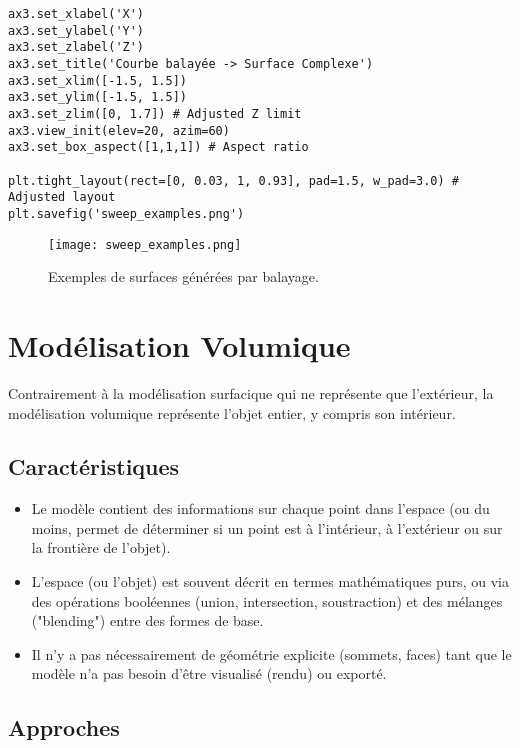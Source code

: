 \documentclass{article}
\begin{document}
\begin{verbatim}
ax3.set_xlabel('X')
ax3.set_ylabel('Y')
ax3.set_zlabel('Z')
ax3.set_title('Courbe balayée -> Surface Complexe')
ax3.set_xlim([-1.5, 1.5])
ax3.set_ylim([-1.5, 1.5])
ax3.set_zlim([0, 1.7]) # Adjusted Z limit
ax3.view_init(elev=20, azim=60)
ax3.set_box_aspect([1,1,1]) # Aspect ratio

plt.tight_layout(rect=[0, 0.03, 1, 0.93], pad=1.5, w_pad=3.0) # Adjusted layout
plt.savefig('sweep_examples.png')
\end{verbatim}

\begin{figure}[H]
\centering
\texttt{[image: sweep\_examples.png]}
\caption{Exemples de surfaces générées par balayage.}
\label{fig:sweep_examples}
\end{figure}

\section{Modélisation Volumique}

Contrairement à la modélisation surfacique qui ne représente que l'extérieur, la modélisation volumique représente l'objet entier, y compris son intérieur.

\subsection{Caractéristiques}
\begin{itemize}
    \item Le modèle contient des informations sur chaque point dans l'espace (ou du moins, permet de déterminer si un point est à l'intérieur, à l'extérieur ou sur la frontière de l'objet).
    \item L'espace (ou l'objet) est souvent décrit en termes mathématiques purs, ou via des opérations booléennes (union, intersection, soustraction) et des mélanges ("blending") entre des formes de base.
    \item Il n'y a pas nécessairement de géométrie explicite (sommets, faces) tant que le modèle n'a pas besoin d'être visualisé (rendu) ou exporté.
\end{itemize}

\subsection{Approches}
\end{document}
